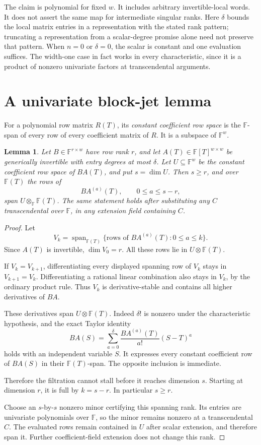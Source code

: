 \documentclass[11pt]{article}
\newtheorem{lemma}[theorem]{Lemma}
\newcommand{\F}{\mathbb F}
\newcommand{\Span}{\operatorname{span}}
\begin{document}
The claim is polynomial for fixed \(w\).
It includes arbitrary invertible-local words. It does not assert the
same map for intermediate singular ranks.
Here \(\delta\) bounds the local matrix entries in a representation
with the stated rank pattern; truncating a representation from a
scalar-degree promise alone need not preserve that pattern.
When \(n=0\) or \(\delta=0\), the scalar is constant and one evaluation
suffices. The width-one case in fact works in every characteristic,
since it is a product of nonzero univariate factors at transcendental
arguments.

\section{A univariate block-jet lemma}

For a polynomial row matrix \(R(T)\), its \emph{constant coefficient
row space} is the \(\F\)-span of every row of every coefficient
matrix of \(R\). It is a subspace of \(\F^w\).

\begin{lemma}\label{lem:block}
Let \(B\in\F^{r\times w}\) have row rank \(r\), and let
\(A(T)\in\F[T]^{w\times w}\) be generically invertible with
entry degrees at most \(\delta\).
Let \(U\subseteq\F^w\) be the constant coefficient row space
of \(BA(T)\), and put \(s=\dim U\).
Then \(s\ge r\), and over \(\F(T)\) the rows of
\[
 BA^{(a)}(T),\qquad 0\le a\le s-r,
\]
span \(U\otimes_\F\F(T)\).
The same statement holds after substituting any \(C\) transcendental
over \(\F\), in any extension field containing \(C\).
\end{lemma}
\begin{proof}
Let
\[
 V_k=\Span_{\F(T)}
 \{\text{rows of }BA^{(a)}(T):0\le a\le k\}.
\]
Since \(A(T)\) is invertible, \(\dim V_0=r\).
All these rows lie in \(U\otimes\F(T)\).

If \(V_k=V_{k+1}\), differentiating every displayed spanning row
of \(V_k\) stays in \(V_{k+1}=V_k\).
Differentiating a rational linear combination also stays in \(V_k\),
by the ordinary product rule. Thus \(V_k\) is derivative-stable
and contains all higher derivatives of \(BA\).

These derivatives span \(U\otimes\F(T)\).
Indeed \(\delta!\) is nonzero under the characteristic hypothesis,
and the exact Taylor identity
\[
 BA(S)=\sum_{a=0}^{\delta}
       \frac{BA^{(a)}(T)}{a!}(S-T)^a
\]
holds with an independent variable \(S\).
It expresses every constant coefficient row of \(BA(S)\)
in their \(\F(T)\)-span. The opposite inclusion is immediate.

Therefore the filtration cannot stall before it reaches dimension
\(s\). Starting at dimension \(r\), it is full by \(k=s-r\).
In particular \(s\ge r\).

Choose an \(s\)-by-\(s\) nonzero minor certifying this spanning rank.
Its entries are univariate polynomials over \(\F\), so the minor
remains nonzero at a transcendental \(C\).
The evaluated rows remain contained in \(U\) after scalar extension,
and therefore span it. Further coefficient-field extension does not
change this rank.
\end{proof}
\end{document}
